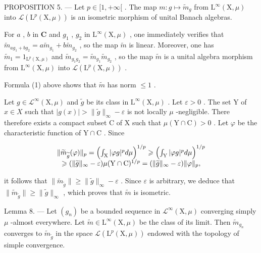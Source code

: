 PROPOSITION 5. --- Let \(p \in [1, +\infty[\) . The map \(m: g \mapsto \widetilde{m}_g\) from \(\mathrm{L}^{\infty}(\mathrm{X}, \mu)\) into \(\mathcal{L}(\mathrm{L}^{p}(\mathrm{X}, \mu))\) is an isometric morphism of unital Banach algebras.

For \(a\) , \(b\) in \(\mathbf{C}\) and \(g_{1}\) , \(g_{2}\) in \(\mathrm{L}^{\infty}(\mathrm{X},\mu)\) , one immediately verifies that \(\widetilde{m}_{ag_1+bg_2}=a\widetilde{m}_{g_1}+b\widetilde{m}_{g_2}\) , so the map \(\widetilde{m}\) is linear. Moreover, one has \(\widetilde{m}_{1}=1_{\mathrm{L}^{p}(\mathrm{X},\mu)}\) and \(\widetilde{m}_{g_{1}g_{2}}=\widetilde{m}_{g_{1}}\widetilde{m}_{g_{2}}\) , so the map \(\widetilde{m}\) is a unital algebra morphism from \(\mathrm{L}^{\infty}(\mathrm{X},\mu)\) into \(\mathcal{L}(\mathrm{L}^{p}(\mathrm{X},\mu))\) .

Formula (1) above shows that \(\widetilde{m}\) has norm \(\leqslant 1\) .

Let \(g \in \mathcal{L}^{\infty}(\mathrm{X},\mu)\) and \(\widetilde{g}\) be its class in \(\mathrm{L}^{\infty}(\mathrm{X},\mu)\) . Let \(\varepsilon > 0\) . The set Y of \(x \in X\) such that \(|g(x)| > \| \widetilde{g}\|_{\infty} - \varepsilon\) is not locally \(\mu\) -negligible. There therefore exists a compact subset C of X such that \(\mu (\mathrm{Y} \cap \mathrm{C}) > 0\) . Let \(\varphi\) be the characteristic function of \(\mathrm{Y} \cap \mathrm{C}\) . Since

\[
\begin{array}{c} \| \widetilde {m} _ {\widetilde {g}} (\varphi) \| _ {p} = \Bigl (\int_ {\mathrm{X}} | \varphi g | ^ {p}   d \mu \Bigr) ^ {1 / p} \geqslant \Bigl (\int_ {\mathrm{Y}} | \varphi g | ^ {p}   d \mu \Bigr) ^ {1 / p} \\ \geqslant (\| \widetilde {g} \| _ {\infty} - \varepsilon) \mu (\mathrm{Y} \cap \mathrm{C}) ^ {1 / p} = (\| \widetilde {g} \| _ {\infty} - \varepsilon) \| \varphi \| _ {p}, \end{array}
\]

it follows that \(\|\widetilde{m}_{\widetilde{g}}\|\geqslant\|\widetilde{g}\|_{\infty}-\varepsilon\) . Since \(\varepsilon\) is arbitrary, we deduce that \(\|\widetilde{m}_{\widetilde{g}}\|\geqslant\|\widetilde{g}\|_{\infty}\) , which proves that \(\widetilde{m}\) is isometric.

Lemma 8. --- Let \((g_n)\) be a bounded sequence in \(\mathcal{L}^\infty(\mathrm{X},\mu)\) converging simply \(\mu\) -almost everywhere. Let \(\widetilde{m} \in \mathrm{L}^\infty(\mathrm{X},\mu)\) be the class of its limit. Then \(\widetilde{m}_{g_n}\) converges to \(\widetilde{m}_{\widetilde{g}}\) in the space \(\mathcal{L}(\mathrm{L}^p(\mathrm{X},\mu))\) endowed with the topology of simple convergence.

